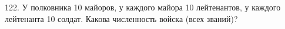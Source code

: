 122. У полковника 10 майоров, у каждого майора 10 лейтенантов, у каждого лейтенанта 10 солдат. Какова численность войска (всех званий)?\\
